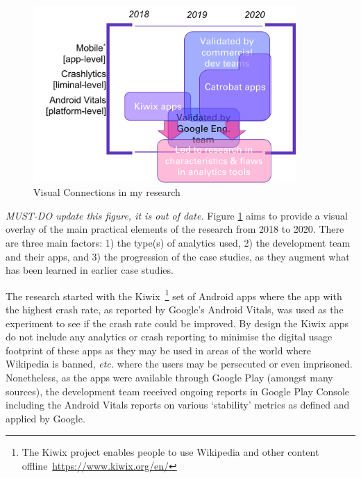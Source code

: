 \begin{figure}[htbp!]
    \centering
    \includegraphics[width=10cm]{images/visual-connections-in-research.png}
    \caption{Visual Connections in my research}
    \label{fig:visual-connections-in-research}
\end{figure}

\textit{MUST-DO update this figure, it is out of date.} Figure \ref{fig:visual-connections-in-research}  aims to provide a visual overlay of the main practical elements of the research from 2018 to 2020. There are three main factors: 1) the type(s) of analytics used, 2) the development team and their apps, and 3) the progression of the case studies, as they augment what has been learned in earlier case studies.

The research started with the Kiwix~\footnote{The Kiwix project enables people to use Wikipedia and other content offline~\url{https://www.kiwix.org/en/}} set of Android apps where the app with the highest crash rate, as reported by Google's Android Vitals, was used as the experiment to see if the crash rate could be improved. By design the Kiwix apps do not include any analytics or crash reporting to minimise the digital usage footprint of these apps as they may be used in areas of the world where Wikipedia is banned, \emph{etc.} where the users may be persecuted or even imprisoned. Nonetheless, as the apps were available through Google Play (amongst many sources), the development team received ongoing reports in Google Play Console including the Android Vitals reports on various `stability' metrics as defined and applied by Google.

